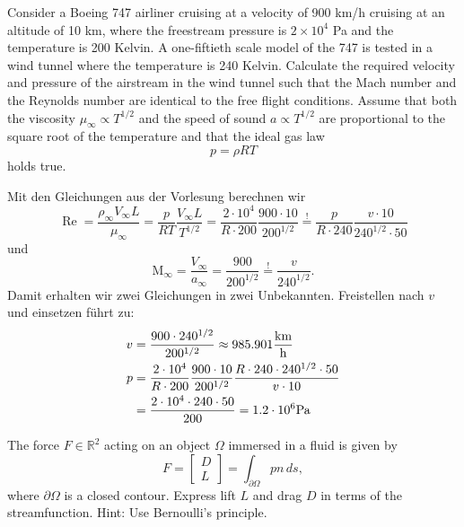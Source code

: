 \documentclass[12pt]{exam}
\newcommand{\del}{\partial}
\begin{document}
\begin{questions}
\begin{solution}
    \end{solution}
    
    
    \question Consider a Boeing 747 airliner cruising at a velocity of 900 km/h cruising at an altitude of 10 km, where the freestream pressure is $2 \times 10^4$ Pa and the temperature is 200 Kelvin. A one-fiftieth scale model of the 747 is tested in a wind tunnel where the temperature is 240 Kelvin. Calculate the required velocity and pressure of the airstream in the wind tunnel such that the Mach number and the Reynolds number are identical to the free flight conditions. Assume that both the viscosity $\mu_{\infty} \propto  T^{1/2}$ and the speed of sound $a \propto T^{1/2}$ are proportional to the square root of the temperature and that the ideal gas law
    \begin{equation*}
        p = \rho R T
    \end{equation*}
    holds true.
    
    \begin{solution}
        Mit den Gleichungen aus der Vorlesung berechnen wir
        \begin{equation*}
            \operatorname{Re} =\frac{\rho_{\infty} V_{\infty } L}{\mu_{\infty}} = \frac{p}{R T} \frac{V_{\infty} L}{T^{1/2}} = \frac{2 \cdot 10^4}{R \cdot 200} \frac{900 \cdot 10}{200^{1/2}} \overset{!}{=} \frac{p}{R \cdot 240} \frac{v \cdot 10}{240^{1/2} \cdot 50}
        \end{equation*}
        und
        \begin{equation*}
            \operatorname{M_{\infty}}=\frac{V_{\infty}}{a_{\infty}} = \frac{900}{200^{1/2}} \stackrel{!}{=} \frac{v}{240^{1/2}}.
        \end{equation*}
        Damit erhalten wir zwei Gleichungen in zwei Unbekannten. Freistellen nach $v$ und einsetzen führt zu:
        \begin{align*}
            v &= \frac{900 \cdot 240^{1/2}}{200^{1/2}} \approx 985.901 \si[per-mode=fraction]{\kilo\meter\per\hour} \\
            p &= \frac{2 \cdot 10^4}{R \cdot 200} \frac{900 \cdot 10}{200^{1/2}} \frac{R \cdot 240 \cdot 240^{1/2} \cdot 50}{v \cdot 10}\\
            &= \frac{2 \cdot 10^4 \cdot 240 \cdot 50}{200} = 1.2 \cdot 10^6 \si{\pascal}
        \end{align*}
    \end{solution}
    
    
    \question The force $F \in \mathbb{R}^2$ acting on an object $\Omega$ immersed in a fluid is given by
    \begin{equation*}
        F =
        \begin{bmatrix}
            D \\
            L
        \end{bmatrix}
        = \int_{\del \Omega} pn \, ds,
    \end{equation*}
    where $\del \Omega$ is a closed contour. Express lift $L$ and drag $D$ in terms of the streamfunction. \newline
    Hint: Use Bernoulli's principle.
    

\end{questions}
\end{document}
